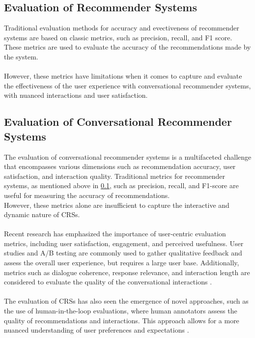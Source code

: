 \subsection{Evaluation of Recommender Systems}
\label{sec:evaluation_of_recommender_systems}
Traditional evaluation methods for accuracy and evectiveness of recommender systems are based on classic metrics, such as precision, recall, and F1 score. 
These metrics are used to evaluate the accuracy of the recommendations made by the system. 
\\\\
However, these metrics have limitations when it comes to capture and evaluate the effectiveness of the user experience with conversational recommender systems, with nuanced interactions and user satisfaction.

\subsection{Evaluation of Conversational Recommender Systems}
\label{sec:evaluation_of_conversational_recommender_systems}
The evaluation of conversational recommender systems is a multifaceted challenge that encompasses various dimensions such as recommendation accuracy, user satisfaction, and interaction quality. 
Traditional metrics for recommender systems, as mentioned above in \cref{sec:evaluation_of_recommender_systems}, such as precision, recall, and F1-score are useful for measuring the accuracy of recommendations. 
\\However, these metrics alone are insufficient to capture the interactive and dynamic nature of CRSs.
\\\\
Recent research has emphasized the importance of user-centric evaluation metrics, including user satisfaction, engagement, and perceived usefulness. User studies and A/B testing are commonly used to gather qualitative feedback and assess the overall user experience, but requires a large user base. 
Additionally, metrics such as dialogue coherence, response relevance, and interaction length are considered to evaluate the quality of the conversational interactions \cite{radlinski2017a}.
\\\\
The evaluation of CRSs has also seen the emergence of novel approaches, such as the use of human-in-the-loop evaluations, where human annotators assess the quality of recommendations and interactions. This approach allows for a more nuanced understanding of user preferences and expectations \cite{mehrotra2018towards}.
